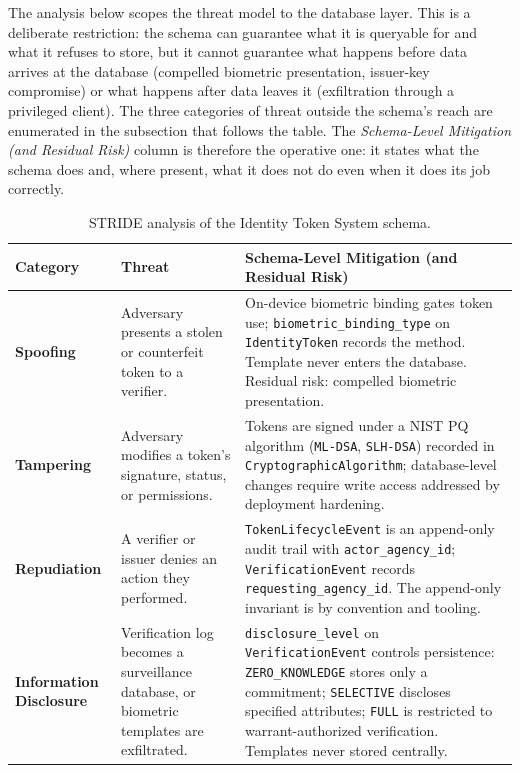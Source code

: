 \documentclass[11pt,letterpaper]{article}
\newcommand{\entity}[1]{\texttt{\color{navydark}#1}}
\newcommand{\thead}[1]{\textbf{\color{white}\small #1}}
\begin{document}
The analysis below scopes the threat model to the database layer. This is a deliberate restriction: the schema can guarantee what it is queryable for and what it refuses to store, but it cannot guarantee what happens before data arrives at the database (compelled biometric presentation, issuer-key compromise) or what happens after data leaves it (exfiltration through a privileged client). The three categories of threat outside the schema's reach are enumerated in the subsection that follows the table. The \textit{Schema-Level Mitigation (and Residual Risk)} column is therefore the operative one: it states what the schema does and, where present, what it does not do even when it does its job correctly.

\begin{table}[H]
\centering
\scriptsize
\caption{STRIDE analysis of the Identity Token System schema.}
\setlength{\tabcolsep}{4pt}
\renewcommand{\arraystretch}{1.05}
\begin{tabularx}{\textwidth}{>{\bfseries}p{1.35in} >{\RaggedRight\arraybackslash}X >{\RaggedRight\arraybackslash}X}
\toprule
\rowcolor{tabheader}
\thead{Category} & \thead{Threat} & \thead{Schema-Level Mitigation (and Residual Risk)} \\
\midrule
Spoofing & Adversary presents a stolen or counterfeit token to a verifier. & On-device biometric binding gates token use; \texttt{biometric\_binding\_type} on \entity{IdentityToken} records the method. Template never enters the database. Residual risk: compelled biometric presentation. \\
Tampering & Adversary modifies a token's signature, status, or permissions. & Tokens are signed under a NIST PQ algorithm (\texttt{ML-DSA}, \texttt{SLH-DSA}) recorded in \entity{CryptographicAlgorithm}; database-level changes require write access addressed by deployment hardening. \\
Repudiation & A verifier or issuer denies an action they performed. & \entity{TokenLifecycleEvent} is an append-only audit trail with \texttt{actor\_agency\_id}; \entity{VerificationEvent} records \texttt{requesting\_agency\_id}. The append-only invariant is by convention and tooling. \\
Information Disclosure & Verification log becomes a surveillance database, or biometric templates are exfiltrated. & \texttt{disclosure\_level} on \entity{VerificationEvent} controls persistence: \texttt{ZERO\_KNOWLEDGE} stores only a commitment; \texttt{SELECTIVE} discloses specified attributes; \texttt{FULL} is restricted to warrant-authorized verification. Templates never stored centrally. \\

\end{tabularx}
\end{table}
\end{document}
